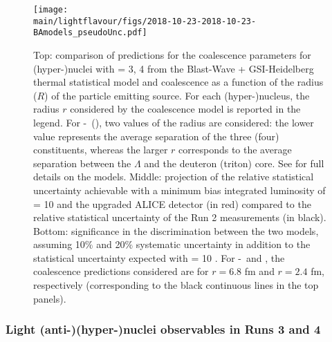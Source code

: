 \begin{figure}[!t]
\begin{center}
\texttt{[image: \\main/lightflavour/figs/2018-10-23-2018-10-23-BAmodels\_pseudoUnc.pdf]}
\end{center}
\caption{
Top: comparison of predictions for the coalescence parameters for (hyper-)nuclei with \Anucl = 3, 4 from the Blast-Wave + GSI-Heidelberg thermal statistical model and coalescence as a function of the radius ($R$) of the particle emitting source. For each (hyper-)nucleus, the radius $r$ considered by the coalescence model is reported in the legend. For \hyp~(\hypfour), two values of the radius are considered: the lower value represents the average separation of the three (four) constituents, whereas the larger $r$ corresponds to the average separation between the $\Lambda$ and the deuteron (triton) core. See \cite{Bellini:2018epz} for full details on the models. Middle: projection of the relative statistical uncertainty achievable with a minimum bias \PbPb integrated luminosity of \Lint = 10 \nbInv and the upgraded ALICE detector (in red) compared to the relative statistical uncertainty of the Run 2 measurements (in black). Bottom: significance in the discrimination between the two models, assuming 10$\%$ and 20$\%$ systematic uncertainty in addition to the statistical uncertainty expected with \Lint = 10 \nbInv. For \hyp~and \hypfour, the coalescence predictions considered are  for $r = 6.8$ fm and $r = 2.4$ fm, respectively (corresponding to the black continuous lines in the top panels).}
\label{fig:BAmodels}
\end{figure}

\subsubsection{Light (anti-)(hyper-)nuclei observables in Runs 3 and 4}
\label{sec:hyper}


